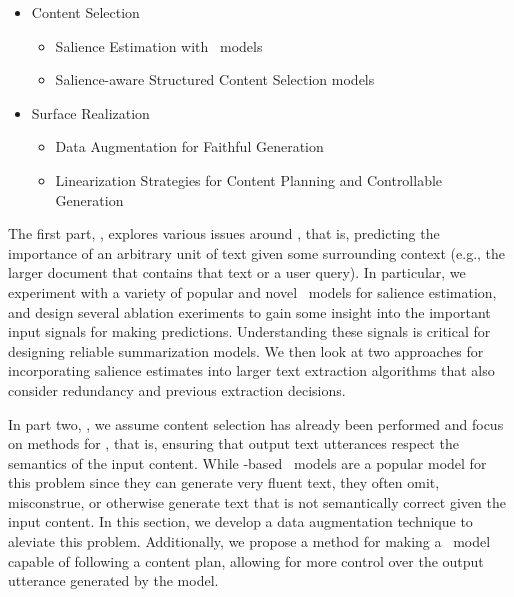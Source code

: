 \begin{itemize}
    \item Content Selection
        \begin{itemize}
            \item Salience Estimation with \DeepLearning~models
            \item Salience-aware Structured Content Selection models
        \end{itemize}
    \item Surface Realization
        \begin{itemize}
            \item Data Augmentation for Faithful Generation
            \item Linearization Strategies for Content Planning and Controllable Generation
        \end{itemize}
    \end{itemize}


The first part, \contentselection, explores various issues around \salienceestimation, that is,
predicting the importance of an arbitrary unit of text given some surrounding context 
(e.g., the larger document that contains that text or a user query). In 
particular, we experiment with a variety of popular and novel 
\deeplearning~models for salience estimation, and design several ablation
exeriments to gain some insight into the important input signals for making 
predictions. Understanding these signals is critical for designing reliable
summarization models. We then look at two approaches 
for incorporating salience
estimates into larger text extraction algorithms that also consider redundancy
and previous extraction decisions. 

In part two, \surfacerealization, we assume content selection has 
already been performed and focus on methods for \faithfulgeneration, that is,
ensuring that output text utterances respect the semantics of the input
content. While \deeplearning-based \sequencetosequence~models are a popular
model for this problem since they can generate very fluent text, they often
omit, misconstrue, or otherwise generate text that is not semantically
correct given the input content. In this section, we develop a data augmentation technique to aleviate this problem. Additionally, we propose a method
for making a \sequencetosequence~model capable of following a content plan,
allowing for more control over the output utterance generated by the model.


